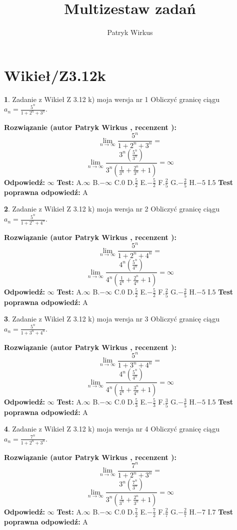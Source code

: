 \documentclass[12pt, a4paper]{article}
\title{Multizestaw zadań}
\author{Patryk Wirkus}
\date{}
\theoremstyle{definition} %
\newtheorem{zad}{}
\newcommand{\kategoria}[1]{\section{#1}}
\newcommand{\zadStart}[1]{\begin{zad}#1\newline}
\newcommand{\zadStop}{\end{zad}}
\newcommand{\rozwStart}[2]{\noindent \textbf{Rozwiązanie (autor #1 , recenzent #2): }\newline}
\newcommand{\rozwStop}{\newline}
\newcommand{\odpStart}{\noindent \textbf{Odpowiedź:}\newline}
\newcommand{\odpStop}{\newline}
\newcommand{\testStart}{\noindent \textbf{Test:}\newline}
\newcommand{\testStop}{\newline}
\newcommand{\kluczStart}{\noindent \textbf{Test poprawna odpowiedź:}\newline}
\newcommand{\kluczStop}{\newline}
\begin{document}
\maketitle

\kategoria{Wikieł/Z3.12k}


\zadStart{Zadanie z Wikieł Z 3.12 k) moja wersja nr 1}
Obliczyć granicę ciągu $a_{n}=\frac{5^{n}}{1+2^{n} + 3^{n}}$.
\zadStop
\rozwStart{Patryk Wirkus}{}
$$\lim\limits_{n\to\infty}\frac{5^{n}}{1+2^{n} + 3^{n}}=$$
$$\lim\limits_{n\to\infty}\frac{3^{n}(\frac{5^{n}}{3^{n}} )}{3^{n}(\frac{1}{3^{n}}+\frac{2^{n}}{3^{n}}+1)} = \infty$$
\rozwStop
\odpStart
$\infty$
\odpStop
\testStart
A.$\infty$
B.$-\infty$
C.$0$
D.$\frac{5}{2}$
E.$-\frac{5}{2}$
F.$\frac{2}{5}$
G.$-\frac{2}{5}$
H.$-5$
I.$5$
\testStop
\kluczStart
A
\kluczStop



\zadStart{Zadanie z Wikieł Z 3.12 k) moja wersja nr 2}
Obliczyć granicę ciągu $a_{n}=\frac{5^{n}}{1+2^{n} + 4^{n}}$.
\zadStop
\rozwStart{Patryk Wirkus}{}
$$\lim\limits_{n\to\infty}\frac{5^{n}}{1+2^{n} + 4^{n}}=$$
$$\lim\limits_{n\to\infty}\frac{4^{n}(\frac{5^{n}}{4^{n}} )}{4^{n}(\frac{1}{4^{n}}+\frac{2^{n}}{4^{n}}+1)} = \infty$$
\rozwStop
\odpStart
$\infty$
\odpStop
\testStart
A.$\infty$
B.$-\infty$
C.$0$
D.$\frac{5}{2}$
E.$-\frac{5}{2}$
F.$\frac{2}{5}$
G.$-\frac{2}{5}$
H.$-5$
I.$5$
\testStop
\kluczStart
A
\kluczStop



\zadStart{Zadanie z Wikieł Z 3.12 k) moja wersja nr 3}
Obliczyć granicę ciągu $a_{n}=\frac{5^{n}}{1+3^{n} + 4^{n}}$.
\zadStop
\rozwStart{Patryk Wirkus}{}
$$\lim\limits_{n\to\infty}\frac{5^{n}}{1+3^{n} + 4^{n}}=$$
$$\lim\limits_{n\to\infty}\frac{4^{n}(\frac{5^{n}}{4^{n}} )}{4^{n}(\frac{1}{4^{n}}+\frac{3^{n}}{4^{n}}+1)} = \infty$$
\rozwStop
\odpStart
$\infty$
\odpStop
\testStart
A.$\infty$
B.$-\infty$
C.$0$
D.$\frac{5}{3}$
E.$-\frac{5}{3}$
F.$\frac{3}{5}$
G.$-\frac{3}{5}$
H.$-5$
I.$5$
\testStop
\kluczStart
A
\kluczStop



\zadStart{Zadanie z Wikieł Z 3.12 k) moja wersja nr 4}
Obliczyć granicę ciągu $a_{n}=\frac{7^{n}}{1+2^{n} + 3^{n}}$.
\zadStop
\rozwStart{Patryk Wirkus}{}
$$\lim\limits_{n\to\infty}\frac{7^{n}}{1+2^{n} + 3^{n}}=$$
$$\lim\limits_{n\to\infty}\frac{3^{n}(\frac{7^{n}}{3^{n}} )}{3^{n}(\frac{1}{3^{n}}+\frac{2^{n}}{3^{n}}+1)} = \infty$$
\rozwStop
\odpStart
$\infty$
\odpStop
\testStart
A.$\infty$
B.$-\infty$
C.$0$
D.$\frac{7}{2}$
E.$-\frac{7}{2}$
F.$\frac{2}{7}$
G.$-\frac{2}{7}$
H.$-7$
I.$7$
\testStop
\kluczStart
A
\kluczStop
\end{document}
